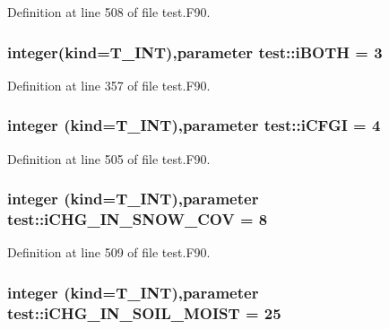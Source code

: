Definition at line 508 of file test.F90.

\hypertarget{namespacetest_abd0173600806ba49317705aafe0c2bf3}{
\subsubsection[{iBOTH}]{\setlength{\rightskip}{0pt plus 5cm}integer(kind={\bf T\_\-INT}),parameter {\bf test::iBOTH} = 3}}
\label{namespacetest_abd0173600806ba49317705aafe0c2bf3}


Definition at line 357 of file test.F90.

\hypertarget{namespacetest_a03bfe6fa65e697740874c9436f435dfe}{
\subsubsection[{iCFGI}]{\setlength{\rightskip}{0pt plus 5cm}integer (kind={\bf T\_\-INT}),parameter {\bf test::iCFGI} = 4}}
\label{namespacetest_a03bfe6fa65e697740874c9436f435dfe}


Definition at line 505 of file test.F90.

\hypertarget{namespacetest_a137ea45f2f434266edd47e7fc2b17c1b}{
\subsubsection[{iCHG\_\-IN\_\-SNOW\_\-COV}]{\setlength{\rightskip}{0pt plus 5cm}integer (kind={\bf T\_\-INT}),parameter {\bf test::iCHG\_\-IN\_\-SNOW\_\-COV} = 8}}
\label{namespacetest_a137ea45f2f434266edd47e7fc2b17c1b}


Definition at line 509 of file test.F90.

\hypertarget{namespacetest_a93ab61cb59cc0d1c60ad3b8d26b070ff}{
\subsubsection[{iCHG\_\-IN\_\-SOIL\_\-MOIST}]{\setlength{\rightskip}{0pt plus 5cm}integer (kind={\bf T\_\-INT}),parameter {\bf test::iCHG\_\-IN\_\-SOIL\_\-MOIST} = 25}}
\label{namespacetest_a93ab61cb59cc0d1c60ad3b8d26b070ff}


